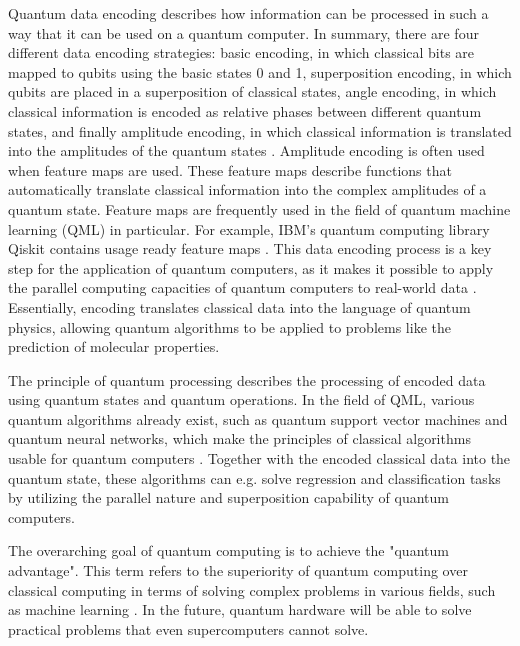 Quantum data encoding describes how information can be processed in such a way that it can be used on a quantum computer. In summary, there are four different data encoding strategies: basic encoding, in which classical bits are mapped to qubits using the basic states 0 and 1, superposition encoding, in which qubits are placed in a superposition of classical states, angle encoding, in which classical information is encoded as relative phases between different quantum states, and finally amplitude encoding, in which classical information is translated into the amplitudes of the quantum states \cite{rath2023quantum}. Amplitude encoding is  often used when feature maps are used. These feature maps describe functions that automatically translate classical information into the complex amplitudes of a quantum state. Feature maps are frequently used in the field of quantum machine learning (QML) in particular. \cite{schuld2015introduction} For example, IBM's quantum computing library Qiskit contains usage ready feature maps \cite{ZZFeatureMap}. This data encoding process is a key step for the application of quantum computers, as it makes it possible to apply the parallel computing capacities of quantum computers to real-world data \cite{rath2023quantum}. Essentially, encoding translates classical data into the language of quantum physics, allowing quantum algorithms to be applied to problems like the prediction of molecular properties.

The principle of quantum processing describes the processing of encoded data using quantum states and quantum operations. In the field of QML, various quantum algorithms already exist, such as quantum support vector machines and quantum neural networks, which make the principles of classical algorithms usable for quantum computers \cite{biamonte2017quantum}. Together with the encoded classical data into the quantum state, these algorithms can e.g. solve regression and classification tasks by utilizing the parallel nature and superposition capability of quantum computers. 

The overarching goal of quantum computing is to achieve the "quantum advantage". This term refers to the superiority of quantum computing over classical computing in terms of solving complex problems in various fields, such as machine learning \cite{daley2022practical}. In the future, quantum hardware will be able to solve practical problems that even supercomputers cannot solve.

